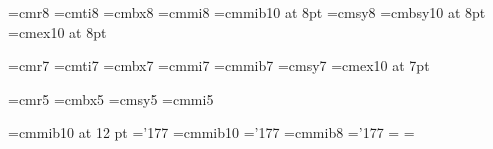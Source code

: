 \font\eightrm=cmr8
\font\eightit=cmti8
\font\eightbf=cmbx8
\font\eighti=cmmi8
\font\eightib=cmmib10 at 8pt
\font\eightsy=cmsy8
\font\eightsy=cmbsy10 at 8pt
\font\eightex=cmex10 at 8pt

\font\sevenrm=cmr7 
\font\sevenit=cmti7
\font\sevenbf=cmbx7
\font\seveni=cmmi7
\font\sevenib=cmmib7
\font\sevensy=cmsy7
\font\sevenex=cmex10 at 7pt

\font\fiverm=cmr5
\font\fivebf=cmbx5
\font\fivesy=cmsy5
\font\fivei=cmmi5

%
\newfam\cmmibfam%
\font\ninecmmib=cmmib10 at 12 pt \skewchar\ninecmmib='177
\font\sevencmmib=cmmib10 \skewchar\sevencmmib='177
\font\fivecmmib=cmmib8 \skewchar\fivecmmib='177
\textfont\cmmibfam=\ninecmmib \scriptfont\cmmibfam\sevencmmib
\scriptscriptfont\cmmibfam=\fivecmmib

\def\bGamma{\mathchar"0800}
\def\bDelta{\mathchar"0801}
\def\bTheta{\mathchar"0802}
\def\bLambda{\mathchar"0803}
\def\bXi{\mathchar"0804}
\def\bPi{\mathchar"0805}
\def\bSigma{\mathchar"0806}
\def\bUpsilon{\mathchar"0807}
\def\bPhi{\mathchar"0808}
\def\bPsi{\mathchar"0809}
\def\bOmega{\mathchar"080A}
\def\balpha{\mathchar"080B}
\def\bbeta{\mathchar"080C}
\def\bgamma{\mathchar"080D}
\def\bdelta{\mathchar"080E}
\def\bepsilon{\mathchar"080F}
\def\bzeta{\mathchar"0810}
\def\bfeta{\mathchar"0811}
\def\btheta{\mathchar"0812}
\def\biota{\mathchar"0813}
\def\bkappa{\mathchar"0814}
\def\blambda{\mathchar"0815}
\def\bmu{\mathchar"0816}
\def\bnu{\mathchar"0817}
\def\bxi{\mathchar"0818}
\def\bpi{\mathchar"0819}
\def\brho{\mathchar"081A}
\def\bsigma{\mathchar"081B}
\def\btau{\mathchar"081C}
\def\bupsilon{\mathchar"081D}
\def\bphi{\mathchar"081E}
\def\bchi{\mathchar"080F}
\def\bpsi{\mathchar"0820}
\def\bomega{\mathchar"0821}
\def\bvarepsilon{\mathchar"0822}
\def\bvartheta{\mathchar"0823}
\def\bvarpi{\mathchar"0824}
\def\bvarrho{\mathchar"0825}
\def\bvarsigma{\mathchar"0826}
\def\bvarphi{\mathchar"0827}





